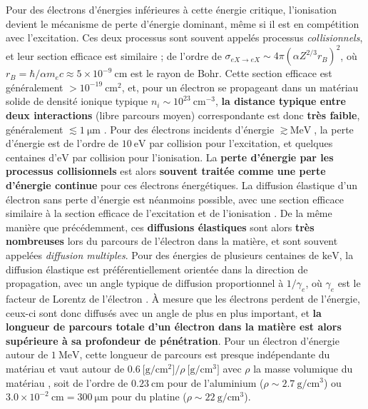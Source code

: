 \begin{refsection}
Pour des électrons d'énergies inférieures à cette énergie critique, l'ionisation devient le mécanisme de perte d'énergie dominant, même si il est en compétition avec l'excitation. Ces deux processus sont souvent appelés processus \textit{collisionnels}, et leur section efficace est similaire ; de l'ordre de \parencite{carron_2007} $\sigma_{e X \to eX} \sim 4 \pi (\alpha Z^{2/3} r_B)^2$, où $r_B=\hbar/\alpha m_e c \approx 5 \times 10^{-9} ~ \si{\cm}$ est le rayon de Bohr. Cette section efficace est généralement $> 10^{-19} ~ \si{\cm^2}$, et, pour un électron se propageant dans un matériau solide de densité ionique typique $n_i \sim 10^{23} ~ \si{\cm^{-3}}$, \textbf{la distance typique entre deux interactions} (libre parcours moyen) correspondante est donc \textbf{très faible}, généralement $\lesssim 1 ~ \si{\um}$ \parencite{carron_2007}. Pour des électrons incidents d'énergie $\gtrsim ~ \si{\MeV}$, la perte d'énergie est de l'ordre de $10 ~ \si{\eV}$ par collision pour l'excitation, et quelques centaines d'$\si{\eV}$ par collision pour l'ionisation. La \textbf{perte d'énergie par les processus collisionnels} est alors \textbf{souvent traitée comme une perte d'énergie continue} pour ces électrons énergétiques. La diffusion élastique d'un électron sans perte d'énergie est néanmoins possible, avec une section efficace similaire à la section efficace de l'excitation et de l'ionisation \parencite{carron_2007}. De la même manière que précédemment, ces \textbf{diffusions élastiques} sont alors \textbf{très nombreuses} lors du parcours de l'électron dans la matière, et sont souvent appelées \textit{diffusion multiples}. Pour des énergies de plusieurs centaines de $\si{\keV}$, la diffusion élastique est préférentiellement orientée dans la direction de propagation, avec un angle typique de diffusion proportionnel à $1/\gamma_e$, où $\gamma_e$ est le facteur de Lorentz de l'électron \parencite{carron_2007}. À mesure que les électrons perdent de l'énergie, ceux-ci sont donc diffusés avec un angle de plus en plus important, et \textbf{la longueur de parcours totale d'un électron dans la matière est alors supérieure à sa profondeur de pénétration}. Pour un électron d'énergie autour de $1 ~ \si{\MeV}$, cette longueur de parcours est presque indépendante du matériau et vaut autour de $0.6 ~ \si{[\g \per \cm^2]} / \rho ~ \si{[\g \per \cm^3]}$ avec $\rho$ la masse volumique du matériau \parencite{carron_2007}, soit de l'ordre de $0.23 ~ \si{\cm}$ pour de l'aluminium ($\rho \sim 2.7 ~ \si{\g \per \cm^3}$) ou $3.0 \times 10^{-2} ~ \si{\cm} = 300 ~ \si{\um}$ pour du platine ($\rho \sim 22 ~ \si{\g \per \cm^3}$).


\end{refsection}
